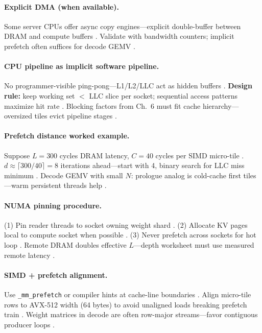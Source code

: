 \paragraph{Explicit DMA (when available).}
Some server CPUs offer async copy engines---explicit double-buffer between DRAM and compute buffers \citep{dlbook}.
Validate with bandwidth counters; implicit prefetch often suffices for decode GEMV \citep{patel2025llminference,memoryfloor2026}.

\paragraph{CPU pipeline as implicit software pipeline.}
No programmer-visible ping-pong---L1/L2/LLC act as hidden buffers \citep{dlbook,chen2020compilerbasedhardw}.
\textbf{Design rule:} keep working set $\lt$ LLC slice per socket; sequential access patterns maximize hit rate \citep{patel2025llminference,memoryfloor2026}.
Blocking factors from Ch.~6 must fit cache hierarchy---oversized tiles evict pipeline stages \citep{yirage2026,dao2022flashattention}.

\paragraph{Prefetch distance worked example.}
Suppose $L{=}300$ cycles DRAM latency, $C{=}40$ cycles per SIMD micro-tile \citep{dlbook,patel2025llminference}.
$d \approx \lceil 300/40 \rceil = 8$ iterations ahead---start with 4, binary search for LLC miss minimum \citep{yirage2026,taxbreak2026}.
Decode GEMV with small $N$: prologue analog is cold-cache first tiles---warm persistent threads help \citep{mpk2025,patel2025llminference}.

\paragraph{NUMA pinning procedure.}
(1) Pin reader threads to socket owning weight shard \citep{kwon2023vllm,patel2025llminference}.
(2) Allocate KV pages local to compute socket when possible \citep{memoryfloor2026}.
(3) Never prefetch across sockets for hot loop \citep{taxbreak2026,chen2020compilerbasedhardw}.
Remote DRAM doubles effective $L$---depth worksheet must use measured remote latency \citep{patel2025llminference,yirage2026}.

\paragraph{SIMD + prefetch alignment.}
Use \texttt{\_mm\_prefetch} or compiler hints at cache-line boundaries \citep{dlbook}.
Align micro-tile rows to AVX-512 width (64 bytes) to avoid unaligned loads breaking prefetch train \citep{patel2025llminference}.
Weight matrices in decode are often row-major streams---favor contiguous producer loops \citep{kwon2023vllm,yirage2026}.

